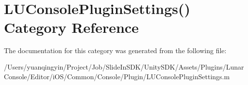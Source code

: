\hypertarget{category_l_u_console_plugin_settings_07_08}{}\section{L\+U\+Console\+Plugin\+Settings() Category Reference}
\label{category_l_u_console_plugin_settings_07_08}


The documentation for this category was generated from the following file\+:\begin{DoxyCompactItemize}
\item 
/\+Users/yuanqingyin/\+Project/\+Job/\+Slide\+In\+S\+D\+K/\+Unity\+S\+D\+K/\+Assets/\+Plugins/\+Lunar\+Console/\+Editor/i\+O\+S/\+Common/\+Console/\+Plugin/L\+U\+Console\+Plugin\+Settings.\+m\end{DoxyCompactItemize}

